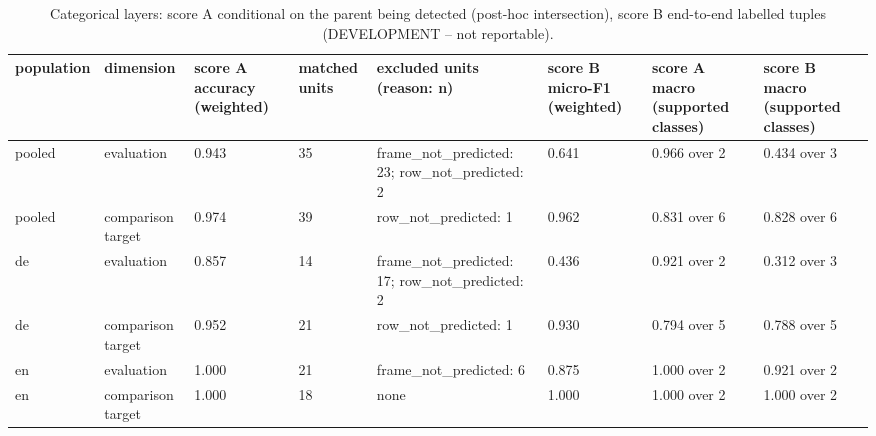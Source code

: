 \begin{table}[htbp]
\centering
\small
\begin{tabular}{llllllll}
\toprule
\textbf{population} & \textbf{dimension} & \textbf{score A accuracy (weighted)} & \textbf{matched units} & \textbf{excluded units (reason: n)} & \textbf{score B micro-F1 (weighted)} & \textbf{score A macro (supported classes)} & \textbf{score B macro (supported classes)} \\
\midrule
pooled & evaluation & 0.943 & 35 & frame\_not\_predicted: 23; row\_not\_predicted: 2 & 0.641 & 0.966 over 2 & 0.434 over 3 \\
pooled & comparison target & 0.974 & 39 & row\_not\_predicted: 1 & 0.962 & 0.831 over 6 & 0.828 over 6 \\
de & evaluation & 0.857 & 14 & frame\_not\_predicted: 17; row\_not\_predicted: 2 & 0.436 & 0.921 over 2 & 0.312 over 3 \\
de & comparison target & 0.952 & 21 & row\_not\_predicted: 1 & 0.930 & 0.794 over 5 & 0.788 over 5 \\
en & evaluation & 1.000 & 21 & frame\_not\_predicted: 6 & 0.875 & 1.000 over 2 & 0.921 over 2 \\
en & comparison target & 1.000 & 18 & none & 1.000 & 1.000 over 2 & 1.000 over 2 \\
\bottomrule
\end{tabular}
\caption{Categorical layers: score A conditional on the parent being detected (post-hoc intersection), score B end-to-end labelled tuples (DEVELOPMENT -- not reportable).}
\end{table}
